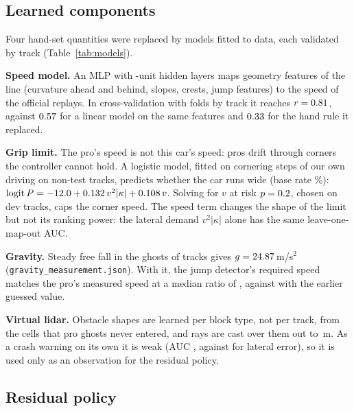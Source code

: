 \documentclass[conference]{IEEEtran}
\begin{document}
\subsection{Learned components}

Four hand-set quantities were replaced by models fitted to data, each validated by track
(Table~\ref{tab:models}).

\textbf{Speed model.} An MLP with \SpeedHidden-unit hidden layers maps \SpeedFeatures geometry features of the
line (curvature ahead and behind, slopes, crests, jump features) to the speed of the official replays. In
cross-validation with folds by track it reaches $r=0.81$, against $0.57$ for a linear model on the
same features and $0.33$ for the hand rule it replaced.

\textbf{Grip limit.} The pro's speed is not this car's speed: pros drift through corners the controller
cannot hold. A logistic model, fitted on \GripSamples cornering steps of our own driving on \GripMaps
non-test tracks, predicts whether the car runs wide (base rate \GripBaseRate\%):
$\operatorname{logit} P = -12.0 + 0.132\, v^2|\kappa| + 0.108\, v$.
Solving for $v$ at risk $p=0.2$, chosen on dev tracks, caps the corner speed. The speed term changes the shape of the limit
but not its ranking power: the lateral demand $v^2|\kappa|$ alone has the same leave-one-map-out AUC.

\textbf{Gravity.} Steady free fall in the ghosts of \GravityMaps tracks gives
$g=24.87$\,m/s$^2$ (\texttt{gravity\_measurement.json}). With it, the jump detector's required speed
matches the pro's measured speed at a median ratio of \GravityNewRatio, against \GravityOldRatio with the
earlier guessed value.

\textbf{Virtual lidar.} Obstacle shapes are learned per block type, not per track, from the cells that pro
ghosts never entered, and \NRays rays are cast over them out to \RayRange\,m. As a crash warning on its own
it is weak (AUC \LidarAUC, against \LateralAUC for lateral error), so it is used only as an observation for
the residual policy.

\begin{table}[t]
\caption{Learned-model validation. All splits are by track. LOMO: leave one map out.}
\label{tab:models}
\centering
\resizebox{\columnwidth}{!}{}
\end{table}

\subsection{Residual policy}
\end{document}

